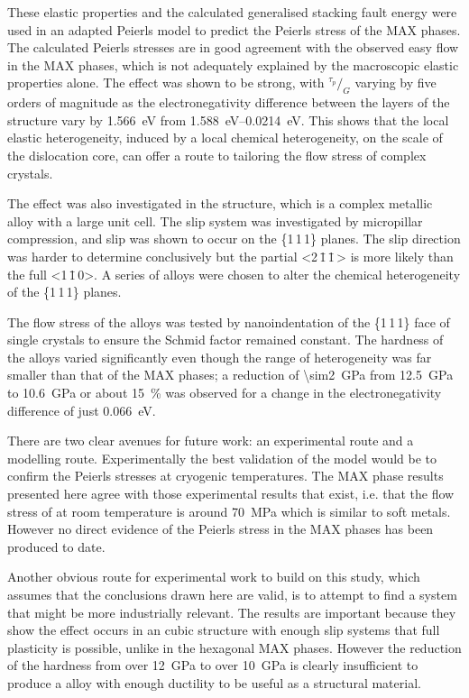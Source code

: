 These elastic properties and the calculated generalised stacking fault energy were used in an adapted Peierls model to predict the Peierls stress of the MAX phases. The calculated Peierls stresses are in good agreement with the observed easy flow in the MAX phases, which is not adequately explained by the macroscopic elastic properties alone. The effect was shown to be strong, with $^{\tau_p}\!/_{G}$ varying by five orders of magnitude as the electronegativity difference between the layers of the structure vary by \SI{1.566}{\electronvolt} from \SIrange{1.588}{0.0214}{\electronvolt}. This shows that the local elastic heterogeneity, induced by a local chemical heterogeneity, on the scale of the dislocation core, can offer a route to tailoring the flow stress of complex crystals.

The effect was also investigated in the  structure, which is a complex metallic alloy with a large unit cell. The slip system was investigated by micropillar compression, and slip was shown to occur on the \{1\,1\,1\} planes. The slip direction was harder to determine conclusively but the partial <2\,\={1}\,\={1}\,> is more likely than the full <1\,\={1}\,0>. A series of alloys were chosen to alter the chemical heterogeneity of the  \{1\,1\,1\} planes. 

The flow stress of the alloys was tested by nanoindentation of the \{1\,1\,1\} face of single crystals to ensure the Schmid factor remained constant. The hardness of the alloys varied significantly even though the range of heterogeneity was far smaller than that of the MAX phases; a reduction of \SI{\sim2}{\giga\pascal} from \SI{12.5}{\giga\pascal} to \SI{10.6}{\giga\pascal} or about \SI{15}{\percent} was observed for a change in the electronegativity difference of just \SI{0.066}{\electronvolt}.



There are two clear avenues for future work: an experimental route and a modelling route. Experimentally the best validation of the model would be to confirm the Peierls stresses at cryogenic temperatures. The MAX phase results presented here agree with those experimental results that exist, i.e. that the flow stress of  at room temperature is around \SI{70}{\mega\pascal} which is similar to soft metals. However no direct evidence of the Peierls stress in the MAX phases has been produced to date.

Another obvious route for experimental work to build on this study, which assumes that the conclusions drawn here are valid, is to attempt to find a system that might be more industrially relevant. The  results are important because they show the effect occurs in an cubic structure with enough slip systems that full plasticity is possible, unlike in the hexagonal MAX phases. However the reduction of the hardness from over \SI{12}{\giga\pascal} to over \SI{10}{\giga\pascal} is clearly insufficient to produce a alloy with enough ductility to be useful as a structural material.

